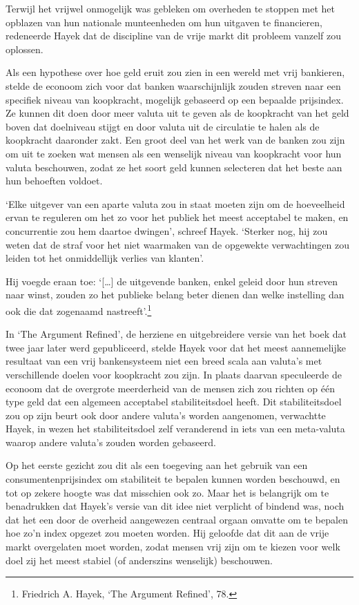 \documentclass[
  a5paper,
  smalldemyvopaper,11pt,twoside,onecolumn,openright,extrafontsizes]{memoir}
\begin{document}
Terwijl het vrijwel onmogelijk was gebleken om overheden te stoppen met
het opblazen van hun nationale munteenheden om hun uitgaven te
financieren, redeneerde Hayek dat de discipline van de vrije markt dit
probleem vanzelf zou oplossen.

Als een hypothese over hoe geld eruit zou zien in een wereld met vrij
bankieren, stelde de econoom zich voor dat banken waarschijnlijk zouden
streven naar een specifiek niveau van koopkracht, mogelijk gebaseerd op
een bepaalde prijsindex. Ze kunnen dit doen door meer valuta uit te
geven als de koopkracht van het geld boven dat doelniveau stijgt en door
valuta uit de circulatie te halen als de koopkracht daaronder zakt. Een
groot deel van het werk van de banken zou zijn om uit te zoeken wat
mensen als een wenselijk niveau van koopkracht voor hun valuta
beschouwen, zodat ze het soort geld kunnen selecteren dat het beste aan
hun behoeften voldoet.

`Elke uitgever van een aparte valuta zou in staat moeten zijn om de
hoeveelheid ervan te reguleren om het zo voor het publiek het meest
acceptabel te maken, en concurrentie zou hem daartoe dwingen', schreef
Hayek. `Sterker nog, hij zou weten dat de straf voor het niet waarmaken
van de opgewekte verwachtingen zou leiden tot het onmiddellijk verlies
van klanten'.

Hij voegde eraan toe: `{[}\ldots{]} de uitgevende banken, enkel geleid
door hun streven naar winst, zouden zo het publieke belang beter dienen
dan welke instelling dan ook die dat zogenaamd nastreeft'.\footnote{Friedrich
  A. Hayek, `The Argument Refined', 78.}

In `The Argument Refined', de herziene en uitgebreidere versie van het
boek dat twee jaar later werd gepubliceerd, stelde Hayek voor dat het
meest aannemelijke resultaat van een vrij bankensysteem niet een breed
scala aan valuta's met verschillende doelen voor koopkracht zou zijn. In
plaats daarvan speculeerde de econoom dat de overgrote meerderheid van
de mensen zich zou richten op één type geld dat een algemeen acceptabel
stabiliteitsdoel heeft. Dit stabiliteitsdoel zou op zijn beurt ook door
andere valuta's worden aangenomen, verwachtte Hayek, in wezen het
stabiliteitsdoel zelf veranderend in iets van een meta-valuta waarop
andere valuta's zouden worden gebaseerd.

Op het eerste gezicht zou dit als een toegeving aan het gebruik van een
consumentenprijsindex om stabiliteit te bepalen kunnen worden beschouwd,
en tot op zekere hoogte was dat misschien ook zo. Maar het is belangrijk
om te benadrukken dat Hayek's versie van dit idee niet verplicht of
bindend was, noch dat het een door de overheid aangewezen centraal
orgaan omvatte om te bepalen hoe zo'n index opgezet zou moeten worden.
Hij geloofde dat dit aan de vrije markt overgelaten moet worden, zodat
mensen vrij zijn om te kiezen voor welk doel zij het meest stabiel (of
anderszins wenselijk) beschouwen.
\end{document}
